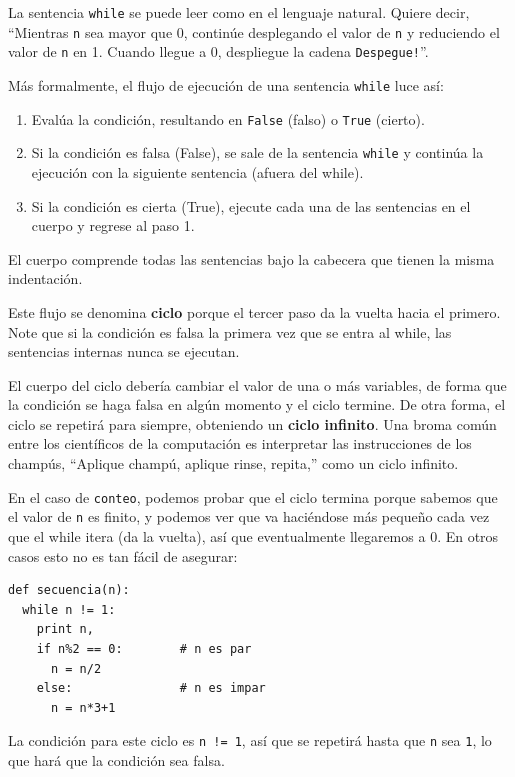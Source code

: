 La sentencia \texttt{while} se puede leer como en el
lenguaje natural. Quiere decir, ``Mientras \texttt{n} sea mayor que 0, continúe
desplegando el valor de  \texttt{n} y reduciendo el valor de \texttt{n} en 1.  
Cuando llegue a 0, despliegue la cadena \texttt{Despegue!}''.

Más formalmente, el flujo de ejecución de una sentencia  \texttt{while} luce
así:

\begin{enumerate}

\item Evalúa la condición, resultando en  \texttt{False} (falso) o 
\texttt{True} (cierto).

\item Si la condición es falsa (False), se sale de la sentencia \texttt{while} y
continúa la ejecución con la siguiente sentencia (afuera del while).

\item Si la  condición es cierta (True), ejecute cada una de las sentencias
en el cuerpo y regrese al paso 1.

\end{enumerate}

El cuerpo comprende todas las sentencias bajo la cabecera que tienen
la misma indentación.

Este flujo se denomina  {\bf ciclo} porque el tercer paso
da la vuelta hacia el primero. Note que si la condición es falsa la primera
vez que se entra al while, las sentencias internas nunca se ejecutan.


El cuerpo del ciclo debería cambiar el valor de una o más  variables,
de forma que la condición se haga falsa en algún momento y el ciclo
termine. De otra forma, el ciclo se repetirá para siempre, obteniendo
un {\bf ciclo infinito}.  Una broma común entre los científicos
de la computación es interpretar las instrucciones de los  champús,
``Aplique champú, aplique rinse, repita,'' como un ciclo infinito.

En el caso de  \texttt{conteo}, podemos probar que el ciclo termina
porque sabemos que el valor de  \texttt{n} es finito, y podemos
ver que va haciéndose más pequeño cada vez que el while itera (da la
vuelta), así que eventualmente llegaremos a 0.  En otros casos esto 
no es tan fácil de asegurar:

\beforeverb
\begin{verbatim}
def secuencia(n):
  while n != 1:
    print n,
    if n%2 == 0:        # n es par
      n = n/2
    else:               # n es impar
      n = n*3+1
\end{verbatim}
\afterverb
%
La condición para este ciclo es \texttt{n != 1}, así que se repetirá
hasta que \texttt{n} sea \texttt{1}, lo que hará que la condición sea falsa.

